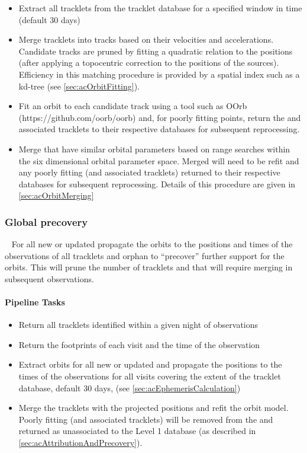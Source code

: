 \begin{itemize}
\item Extract all tracklets from the tracklet database for a specified window in time (default 30 days)
\item Merge tracklets into tracks based on their velocities and accelerations. Candidate tracks are pruned by fitting a quadratic relation to the positions (after applying a topocentric correction to the positions of the sources). Efficiency in this matching procedure is provided by a spatial index such as a kd-tree (see \ref{sec:acOrbitFitting}). 
\item Fit an orbit to each candidate track using a tool such as OOrb \\(https://github.com/oorb/oorb) and, for poorly fitting  points, return the \DIASources and associated tracklets to their respective databases for subsequent reprocessing.
\item Merge \SSObjects that have similar orbital parameters based on range searches within the six dimensional orbital parameter space.  Merged \SSObjects will need to be refit and any poorly fitting \DIASources (and associated tracklets) returned  to their respective databases for subsequent reprocessing. Details of this procedure are given in \ref{sec:acOrbitMerging}
\end{itemize}

\subsubsection{Global precovery}~
For all new or updated \SSObjects propagate the orbits to the positions and times of the observations of all tracklets and orphan \DIAObjects to ``precover'' further support for the orbits. This will prune the number of tracklets and \DIAObjects that will require merging in subsequent observations. 

\paragraph{Pipeline Tasks}

\begin{itemize}
\item Return all tracklets identified within a given night of observations
\item Return the footprints of each visit and the time of the observation
\item Extract orbits for all new or updated \SSObjects and propagate the positions to the times of the observations for all visits covering the extent of the tracklet database, default 30 days, (see \ref{sec:acEphemerisCalculation})
\item Merge the tracklets with the projected \SSObject positions and refit the \SSObject orbit model. Poorly fitting \DIASources (and associated tracklets) will be removed from the \SSObject and returned as unassociated \DIAObjects to the Level 1 database (as described in \ref{sec:acAttributionAndPrecovery}).
\end{itemize}


